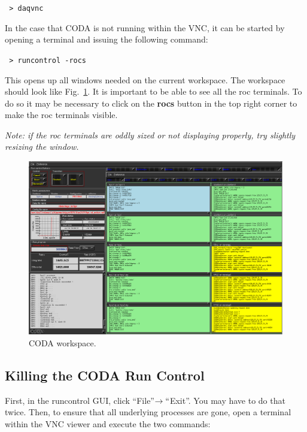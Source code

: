 \documentclass[12pt]{article}
\begin{document}
    \noindent
    \texttt{\hspace*{1cm} > daqvnc}\newline

\noindent
In the case that CODA is not running within the VNC, it can be started by 
opening a terminal and issuing the following command:\newline

    \noindent
    \texttt{\hspace*{1cm} > runcontrol -rocs}\newline

\noindent
This opens up all windows needed on the current workspace. The workspace should
look like Fig.~\ref{fig:coda}. It is important to be able to see all the roc 
terminals.  To do so it may be necessary to click on the {\bf rocs} button in 
the top right corner to make the roc terminals visible. \newline

\noindent
{\em Note:  if the roc terminals are oddly sized or not displaying properly, try slightly resizing the window.}
\begin{figure}[htbp]
\begin{center}
    \includegraphics[width=.8\textwidth]{runcontrol_start.png}
\caption{CODA workspace.}
\label{fig:coda}
\end{center}
\vspace*{-5mm}
\end{figure}

\subsection{Killing the CODA Run Control}\label{sec:daqexit}

\noindent
First, in the runcontrol GUI, click ``File''$\to``$Exit''.  You may have to do
that twice. Then, to ensure that all underlying processes are gone, open a terminal within
the VNC viewer and execute the two commands:\newline
    
\end{document}
